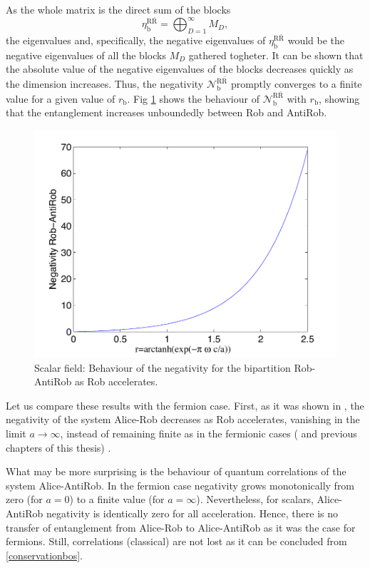 As the whole matrix is the direct sum of the blocks
\begin{equation}
\eta_\text{b}^{\text{R}{\bar{\text{R}}}}=\bigoplus_{D=1}^\infty M_D,
\end{equation}
the eigenvalues and, specifically, the negative eigenvalues of $\eta_\text{b}^{\text{R}{\bar{\text{R}}}}$ would be the negative eigenvalues of all the blocks $M_D$ gathered togheter. It can be shown that the absolute value of the negative eigenvalues of the blocks decreases quickly as the dimension increases. Thus, the negativity $\mathcal{N}^{\text{R}{\bar{\text{R}}}}_\text{b}$ promptly converges to a finite value for a given value of $r_\text{b}$.  Fig  \ref{negaRARbos} shows the behaviour of $\mathcal{N}^{\text{R}{\bar{\text{R}}}}_\text{b}$ with $r_\text{b}$, showing that the entanglement increases unboundedly between Rob and AntiRob.

\begin{figure}[h]
\begin{center}
\includegraphics[width=.85\textwidth]{negaRARbos}
\caption{ Scalar field: Behaviour of the negativity for the bipartition Rob-AntiRob as Rob accelerates.}
\label{negaRARbos}
\end{center}
\end{figure}

Let us compare these results with the fermion case. First, as it was shown in \cite{AlsingSchul}, the negativity of the system Alice-Rob decreases as Rob accelerates, vanishing in the limit $a\rightarrow\infty$, instead of remaining finite as in the fermionic cases (\cite{AlsingSchul} and previous chapters of this thesis) .

What may be more surprising is the behaviour of quantum correlations of the system Alice-AntiRob. In the fermion case negativity grows monotonically from zero (for $a=0$) to a finite value (for $a=\infty$). Nevertheless, for scalars, Alice-AntiRob negativity is identically zero for all acceleration. Hence, there is no transfer of entanglement from Alice-Rob to Alice-AntiRob as it was the case for fermions. Still, correlations (classical) are not lost as it can be concluded from \eqref{conservationbos}.


